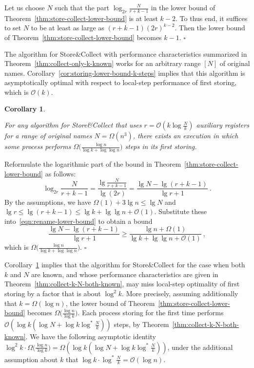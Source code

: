 \documentclass[11pt]{article}
\newcommand{\cO}{\mathcal{O}}
\newcommand{\qed}{\hfill $\square$ \smallbreak}
\newenvironment{proof}{\noindent{\bf Proof:}}{\qed}
\newtheorem{corollary}{Corollary}
\begin{document}
\begin{proof}
Let us choose $N$ such that the part $\log_{2r} \frac{N}{r+k-1}$ in the lower bound of Theorem~\ref{thm:store-collect-lower-bound} is at least $k-2$.
To thus end, it suffices to set $N$ to be at least as large as $(r+k-1)(2r)^{k-2} $.
Then the lower bound of Theorem~\ref{thm:store-collect-lower-bound} becomes $k-1$.
\end{proof}


The algorithm for Store\&Collect with performance characteristics summarized in Theorem~\ref{thm:collect-only-k-known} works for an arbitrary range $[N]$ of original names.
Corollary~\ref{cor:storing-lower-bound-k-steps} implies that this algorithm is asymptotically optimal with respect to local-step performance of first storing, which is $\cO(k)$.



\begin{corollary}
\label{cor:lower-bound-k-N-storing}

For any algorithm for Store\&Collect that  uses $r=\cO(k\log\frac{N}{k})$ auxiliary registers for a range of original names $N=\Omega(n^3)$, there exists an execution in which some process performs $\Omega\bigl(\frac{\log n}{\log k +\log\log n}\bigr)$ steps in its first storing.
\end{corollary}

\begin{proof}
Reformulate the logarithmic part of the bound in Theorem~\ref{thm:store-collect-lower-bound} as follows:
\begin{equation}
\label{eqn:store-lower-bound}
\log_{2r} \frac{N}{r+k-1} = \frac{\lg \frac{N}{r+k-1}}{\lg (2r)} = \frac{\lg N-\lg (r +k-1)}{\lg r + 1}
\ .
\end{equation}
By the assumptions, we have $\Omega(1) + 3\lg n \le \lg N$  and $\lg  r \le  \lg (r+k-1) \le \lg k + \lg\lg n +\cO(1)$.
Substitute these into~\eqref{eqn:rename-lower-bound} to obtain a bound
\[
\frac{\lg N-\lg (r +k-1)}{\lg r + 1} \ge\frac{\lg n +\Omega(1)}{\lg k+ \lg\lg n +\cO(1)}
\ ,
\]
which is $\Omega\bigl(\frac{\log n}{\log k+\log\log n}\bigr)$.
\end{proof}

Corollary~\ref{cor:lower-bound-k-N-storing} implies that the algorithm for Store\&Collect for the case when both $k$ and $N$ are known, and whose performance characteristics are given in Theorem~\ref{thm:collect-k-N-both-known}, may miss local-step optimality of first storing by a factor that is about $\log ^2 k$.
More precisely, assuming additionally that $k=\Omega(\log n)$, the lower bound of Theorem~\ref{thm:store-collect-lower-bound} becomes $\Omega\bigl(\frac{\log n}{\log k}\bigr)$. 
Each process storing for the first time  performs  $\cO(\log k (\log N + \log k\log^* \frac{N}{k}))$ steps, by Theorem~\ref{thm:collect-k-N-both-known}. 
We have the following asymptotic  identity $\log ^2 k \cdot \Omega\bigl(\frac{\log n}{\log k}\bigr) =\Omega(\log k (\log N + \log k\log^* \frac{N}{k}))$, under the additional assumption about $k$ that $\log k\cdot \log^* \frac{N}{k} =\cO(\log n)$.
\end{document}

